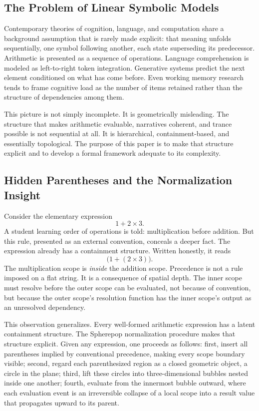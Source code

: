 \documentclass[12pt, a4paper]{article}
\theoremstyle{plain}
\theoremstyle{definition}
\theoremstyle{remark}
\begin{document}
\subsection{The Problem of Linear Symbolic Models}

Contemporary theories of cognition, language, and computation share a
background assumption that is rarely made explicit: that meaning unfolds
sequentially, one symbol following another, each state superseding its
predecessor. Arithmetic is presented as a sequence of operations. Language
comprehension is modeled as left-to-right token integration. Generative
systems predict the next element conditioned on what has come before. Even
working memory research tends to frame cognitive load as the number of items
retained rather than the structure of dependencies among them.

This picture is not simply incomplete. It is geometrically misleading. The
structure that makes arithmetic evaluable, narratives coherent, and trance
possible is not sequential at all. It is hierarchical, containment-based, and
essentially topological. The purpose of this paper is to make that structure
explicit and to develop a formal framework adequate to its complexity.

\subsection{Hidden Parentheses and the Normalization Insight}

Consider the elementary expression
\[
  1 + 2 \times 3.
\]
A student learning order of operations is told: multiplication before
addition. But this rule, presented as an external convention, conceals a
deeper fact. The expression already has a containment structure. Written
honestly, it reads
\[
  \bigl(1 + (2 \times 3)\bigr).
\]
The multiplication scope is \emph{inside} the addition scope. Precedence is
not a rule imposed on a flat string. It is a consequence of spatial depth.
The inner scope must resolve before the outer scope can be evaluated, not
because of convention, but because the outer scope's resolution function has
the inner scope's output as an unresolved dependency.

This observation generalizes. Every well-formed arithmetic expression has a
latent containment structure. The Spherepop normalization procedure makes
that structure explicit. Given any expression, one proceeds as follows: first,
insert all parentheses implied by conventional precedence, making every scope
boundary visible; second, regard each parenthesized region as a closed
geometric object, a circle in the plane; third, lift these circles into
three-dimensional bubbles nested inside one another; fourth, evaluate from
the innermost bubble outward, where each evaluation event is an irreversible
collapse of a local scope into a result value that propagates upward to its
parent.
\end{document}
